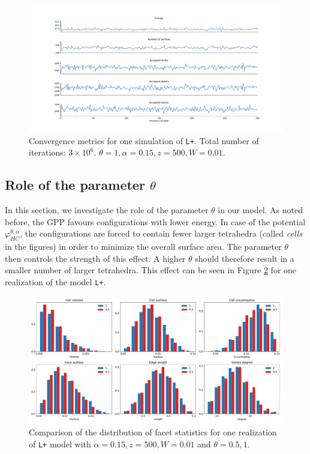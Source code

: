 \begin{figure}
	\includegraphics[width=1\textwidth]{../img/numeric/convergence.pdf}
  \caption{Convergence metrics for one simulation of \texttt{L+}. Total number of iterations: $3\times 10^6$. $\theta = 1, \alpha = 0.15, z = 500, W = 0.01$.}
  \label{fig:convergence}
\end{figure}


\subsection{Role of the parameter $\theta$}
In this section, we investigate the role of the parameter $\theta$ in our model. As noted before, the GPP favours configurations with lower energy. In case of the potential $\varphi^{\theta,\alpha}_{HC}$, the configurations are forced to contain fewer larger tetrahedra (called \textit{cells} in the figures) in order to minimize the overall surface area. The parameter $\theta$ then controls the strength of this effect. A higher $\theta$ should therefore result in a smaller number of larger tetrahedra. This effect can be seen in Figure \ref{fig:thetaeffect} for one realization of the model \texttt{L+}.

\begin{figure}
  \centering
  \includegraphics[width=1\textwidth]{../img/numeric/facets_1_05.pdf}
  \caption{Comparison of the distribution of facet statistics for one realization of \texttt{L+} model with $\alpha=0.15,z=500,W=0.01$ and $\theta = 0.5,1$.  }
  \label{fig:thetaeffect}
\end{figure}


